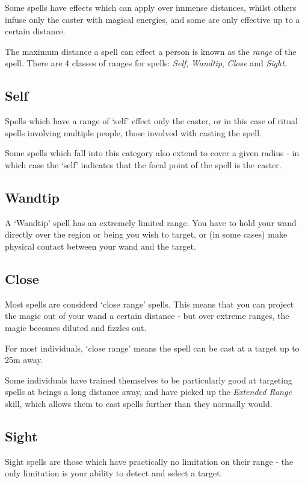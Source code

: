 Some spells have effects which can apply over immense distances, whilst others infuse only the caster with magical energies, and some are only effective up to a certain distance. 

The maximum distance a spell can effect a person is known as the {\it range} of the spell. There are 4 classes of ranges for spells: {\it Self}, {\it Wandtip}, {\it Close} and {\it Sight}.

\subsection{Self}

Spells which have a range of `self' effect only the caster, or in this case of ritual spells involving multiple people, those involved with casting the spell.   

Some spells which fall into this category also extend to cover a given radius - in which case the `self' indicates that the focal point of the spell is the caster. 

\subsection{Wandtip}

A `Wandtip' spell has an extremely limited range. You have to hold your wand directly over the region or being you wish to target, or (in some cases) make physical contact between your wand and the target. 

\subsection{Close}

Most spells are considerd `close range' spells. This means that you can project the magic out of your wand a certain distance - but over extreme ranges, the magic becomes diluted and fizzles out. 

For most individuals, `close range' means the spell can be cast at a target up to 25m away. 

Some individuals have trained themselves to be particularly good at targeting spells at beings a long distance away, and have picked up the {\it Extended Range} skill, which allows them to cast spells further than they normally would. 

\subsection{Sight}

Sight spells are those which have practically no limitation on their range - the only limitation is your ability to detect and select a target.  

